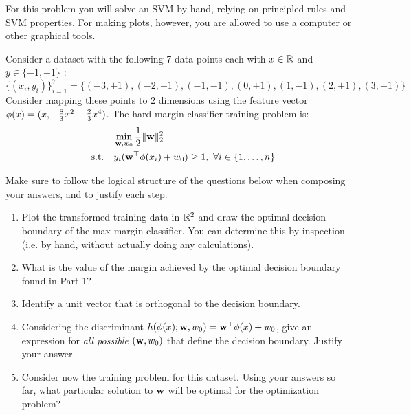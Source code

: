 \documentclass[submit]{../harvardml}
\begin{document}
\begin{problem}
  For this problem you will solve an SVM by hand, relying on principled rules and SVM properties. 
  For making plots, however, you are allowed to use a computer or other graphical tools.

  Consider a dataset with the following 7 data points each with $x \in \mathbb{R}$ and $y \in \{ -1, +1 \}$ : \[\{(x_i, y_i)\}_{i = 1}^7 =\{(-3 , +1) , (-2 , +1 ) , (-1,  -1 ), (0, +1), ( 1 , -1 ), ( 2 , +1 ) , (3 , +1 )\}\] Consider
  mapping these points to $2$ dimensions using the feature vector $\mathbf{\phi}(x) =  (x, -\frac{8}{3}x^2 + \frac{2}{3}x^4)$. The hard margin classifier training problem is:
  \begin{align*}
    &\min_{\mathbf{w}, w_0} \frac{1}{2}\|\mathbf{w}\|_2^2 \label{eq:dcp} \\
    \quad \text{s.t.} \quad & y_i(\mathbf{w}^\top \mathbf{\phi}(x_i) + w_0) \geq 1,~\forall i \in \{1,\ldots, n\}\notag
  \end{align*}

  Make sure to follow the logical structure of
  the questions below when composing your answers, and to justify each step.

  \begin{enumerate}
    \item Plot the transformed training data in $\mathbb{R}^2$ and draw the optimal decision boundary
    of the max margin classifier. You can determine this by inspection (i.e. by hand, without actually doing any calculations).

    \item What is the value of the margin achieved by the optimal
    decision boundary found in Part 1? 

    \item Identify a unit vector that is orthogonal to the decision boundary.

    \item Considering the discriminant $h(\mathbf{\phi}(x);\mathbf{w},w_0)=\mathbf{w}^\top\mathbf{\phi}(x) +w_0$, 
    give an expression for {\em all possible} $(\mathbf{w},w_0)$ that define
    the decision boundary. Justify your answer.

    \item Consider now the training problem for this dataset. Using your answers so far,
    what particular solution to $\mathbf{w}$ will be optimal for the
    optimization problem?


\end{enumerate}
\end{problem}
\end{document}
